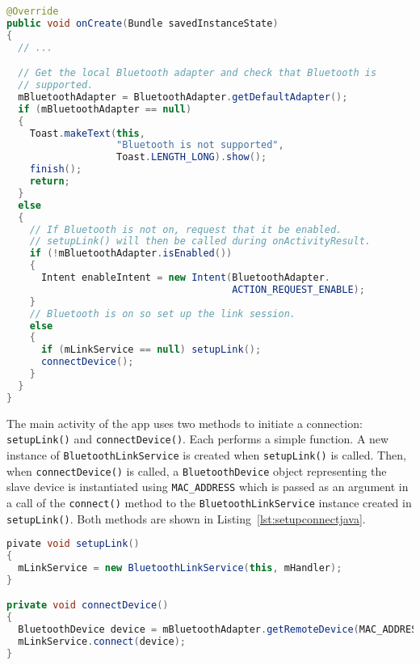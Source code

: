 \documentclass[11pt, a4paper, oneside, english]{scrbook}
\begin{document}
\begin{lstlisting}[language=Java,
                   caption={Check Bluetooth is supported and enabled.},
                   label=lst:btsupportenablejava,
                   numbers=none]
@Override
public void onCreate(Bundle savedInstanceState)
{
  // ...

  // Get the local Bluetooth adapter and check that Bluetooth is
  // supported.
  mBluetoothAdapter = BluetoothAdapter.getDefaultAdapter();
  if (mBluetoothAdapter == null)
  {
    Toast.makeText(this,
                   "Bluetooth is not supported",
                   Toast.LENGTH_LONG).show();
    finish();
    return;
  }
  else
  {
    // If Bluetooth is not on, request that it be enabled.
    // setupLink() will then be called during onActivityResult.
    if (!mBluetoothAdapter.isEnabled())
    {
      Intent enableIntent = new Intent(BluetoothAdapter.
                                       ACTION_REQUEST_ENABLE);
    }
    // Bluetooth is on so set up the link session.
    else
    {
      if (mLinkService == null) setupLink();
      connectDevice();
    }
  }
}
\end{lstlisting}
The main activity of the app uses two methods to initiate a connection: \texttt{setupLink()} and \texttt{connectDevice()}. Each performs a simple function. A new instance of \texttt{BluetoothLinkService} is created when \texttt{setupLink()} is called. Then, when \texttt{connectDevice()} is called, a \texttt{BluetoothDevice} object representing the slave device is instantiated using \texttt{MAC\_ADDRESS} which is passed as an argument in a call of the \texttt{connect()} method to the \texttt{BluetoothLinkService} instance created in \texttt{setupLink()}. Both methods are shown in Listing~\ref{lst:setupconnectjava}.
\begin{lstlisting}[language=Java,
                   caption={The \texttt{setupLink()} and \texttt{connectDevice()} methods.},
                   label=lst:setupconnectjava,
                   numbers=none]
pivate void setupLink()
{ 
  mLinkService = new BluetoothLinkService(this, mHandler);
}

private void connectDevice()
{
  BluetoothDevice device = mBluetoothAdapter.getRemoteDevice(MAC_ADDRESS);
  mLinkService.connect(device);
}
\end{lstlisting}
\end{document}
